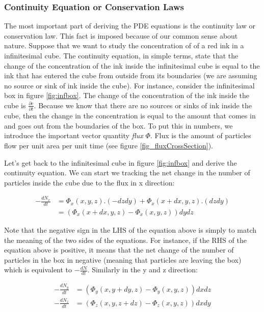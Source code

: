 \subsubsection{Continuity Equation or Conservation Laws}
The most important part of deriving the PDE equations is the continuity law or conservation law. This fact is imposed because of our common sense about nature. Suppose that we want to study the concentration of of a red ink in a infinitesimal cube. The continuity equation, in simple terms, state that the change of the concentration of the ink inside the infinitesimal cube is equal to the ink that has entered the cube from outside from its boundaries (we are assuming no source or sink of ink inside the cube). For instance, consider the infinitesimal box in figure \ref{fig:infbox}. The change of the concentration of the ink inside the cube is $\frac{\partial c}{\partial t}$. Because we know that there are no sources or sinks of ink inside the cube, then the change in the concentration is equal to the amount that comes in and goes out from the boundaries of the box. To put this in numbers, we introduce the important vector quantity \emph{flux} $ \Phi $. Flux is the amount of particles flow per unit area per unit time (see figure \ref{fig_fluxCrossSection}).





\newpage

Let's get back to the infinitesimal cube in figure \ref{fig:infbox} and derive the continuity equation. We can start we tracking the net change in the number of particles inside the cube due to the flux in x direction:

\begin{align*}
	-\frac{dN_x}{dt} &= \Phi_x(x,y,z) . (-dz dy) + \Phi_x(x +dx, y,z) . (dzdy) \\
	 				&= (\Phi_x(x+dx,y,z)-\Phi_x(x,y,z))dydz 
\end{align*}

Note that the negative sign in the LHS of the equation above is simply to match the meaning of the two sides of the equations. For instance, if the RHS of the equation above is positive, it means that the net change of the number of particles in the box in negative (meaning that particles are leaving the box) which is equivalent to $ -\frac{dN}{dt} $. Similarly in the y and z direction:

\begin{align*}
	-\frac{dN_y}{dt} &= (\Phi_y(x,y+dy,z)-\Phi_y(x,y,z)) dx dz \\
	-\frac{dN_z}{dt} &= (\Phi_z(x,y,z+dz) - \Phi_z(x,y,z)) dx dy
\end{align*}

